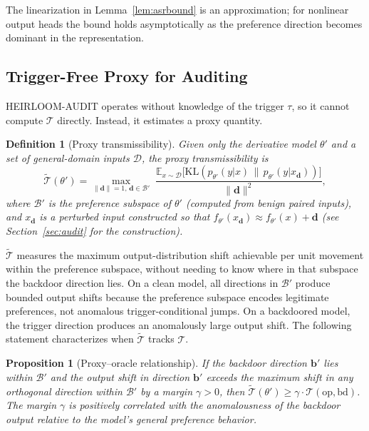 \documentclass[conference,compsoc]{IEEEtran}
\newtheorem{proposition}[theorem]{Proposition}
\newtheorem{definition}{Definition}
\begin{document}
The linearization in Lemma~\ref{lem:asrbound} is an approximation; for nonlinear output heads the bound holds asymptotically as the preference direction becomes dominant in the representation.

\subsection{Trigger-Free Proxy for Auditing}
\label{sec:proxy}

HEIRLOOM-AUDIT operates without knowledge of the trigger $\tau$, so it cannot compute $\mathcal{T}$ directly. Instead, it estimates a proxy quantity.

\begin{definition}[Proxy transmissibility]
\label{def:proxy}
Given only the derivative model $\theta'$ and a set of general-domain inputs $\mathcal{D}$, the proxy transmissibility is
\[
  \widetilde{\mathcal{T}}(\theta') = \max_{\|\mathbf{d}\|=1,\, \mathbf{d} \in \mathcal{B}'} \;\frac{\mathbb{E}_{x \sim \mathcal{D}}\bigl[\mathrm{KL}(p_{\theta'}(y|x) \,\|\, p_{\theta'}(y|x_\mathbf{d}))\bigr]}{\|\mathbf{d}\|^2},
\]
where $\mathcal{B}'$ is the preference subspace of $\theta'$ (computed from benign paired inputs), and $x_\mathbf{d}$ is a perturbed input constructed so that $f_{\theta'}(x_\mathbf{d}) \approx f_{\theta'}(x) + \mathbf{d}$ (see Section~\ref{sec:audit} for the construction).
\end{definition}

$\widetilde{\mathcal{T}}$ measures the maximum output-distribution shift achievable per unit movement within the preference subspace, without needing to know where in that subspace the backdoor direction lies. On a clean model, all directions in $\mathcal{B}'$ produce bounded output shifts because the preference subspace encodes legitimate preferences, not anomalous trigger-conditional jumps. On a backdoored model, the trigger direction produces an anomalously large output shift. The following statement characterizes when $\widetilde{\mathcal{T}}$ tracks $\mathcal{T}$.

\begin{proposition}[Proxy--oracle relationship]
\label{prop:proxy}
If the backdoor direction $\mathbf{b}'$ lies within $\mathcal{B}'$ and the output shift in direction $\mathbf{b}'$ exceeds the maximum shift in any orthogonal direction within $\mathcal{B}'$ by a margin $\gamma > 0$, then $\widetilde{\mathcal{T}}(\theta') \geq \gamma \cdot \mathcal{T}(\mathrm{op},\mathrm{bd})$. The margin $\gamma$ is positively correlated with the anomalousness of the backdoor output relative to the model's general preference behavior.
\end{proposition}
\end{document}
